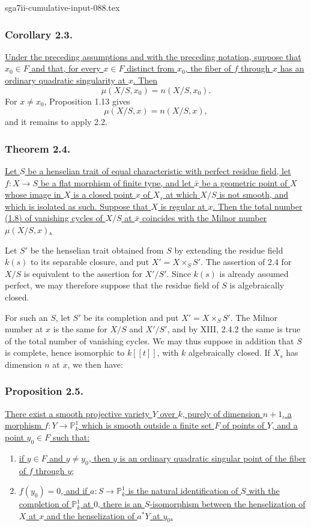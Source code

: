 \begin{filecontents*}{sga7ii-cumulative-input-088.tex}
\subsubsection*{Corollary 2.3.}
\underline{Under the preceding assumptions and with the preceding
notation, suppose that $x_0\in F$ and that, for every
$x\in F$ distinct from $x_0$, the fiber of $f$ through $x$ has an
ordinary quadratic singularity at $x$.  Then}
\[
\mu(X/S,x_0)=n(X/S,x_0).
\]
For $x\ne x_0$, Proposition 1.13 gives
\[
\mu(X/S,x)=n(X/S,x),
\]
and it remains to apply 2.2.

\subsubsection*{Theorem 2.4.}
\underline{Let $S$ be a henselian trait of equal characteristic with
perfect residue field, let $f:X\to S$ be a flat morphism of finite
type, and let $\bar x$ be a geometric point of $X$ whose image in
$X$ is a closed point $x$ of $X_s$ at which $X/S$ is not smooth,
and which is isolated as such.  Suppose that $X$ is regular at $x$.
Then the total number (1.8) of vanishing cycles of $X/S$ at $\bar x$
coincides with the Milnor number $\mu(X/S,x)$.}

Let $S'$ be the henselian trait obtained from $S$ by extending the
residue field $k(s)$ to its separable closure, and put
$X'=X\times_S S'$.  The assertion of 2.4 for $X/S$ is equivalent to
the assertion for $X'/S'$.  Since $k(s)$ is already assumed perfect,
we may therefore suppose that the residue field of $S$ is
algebraically closed.

For such an $S$, let $S'$ be its completion and put
$X'=X\times_S S'$.  The Milnor number at $x$ is the same for $X/S$
and $X'/S'$, and by XIII, 2.4.2 the same is true of the total number
of vanishing cycles.  We may thus suppose in addition that $S$ is
complete, hence isomorphic to $k[[t]]$, with $k$ algebraically
closed.  If $X_s$ has dimension $n$ at $x$, we then have:

\subsubsection*{Proposition 2.5.}
\underline{There exist a smooth projective variety $Y$ over $k$,
purely of dimension $n+1$, a morphism
$f:Y\to\mathbb P^1_k$ which is smooth outside a finite set $F$ of
points of $Y$, and a point $y_0\in F$ such that:}
\begin{enumerate}
\item[(a)] \underline{if $y\in F$ and $y\ne y_0$, then $y$ is an
ordinary quadratic singular point of the fiber of $f$ through $y$;}
\item[(b)] \underline{$f(y_0)=0$, and if
$a:S\to\mathbb P^1_k$ is the natural identification of $S$ with the
completion of $\mathbb P^1_k$ at $0$, there is an $S$-isomorphism
between the henselization of $X$ at $x$ and the henselization of
$a^*Y$ at $y_0$.}
\end{enumerate}


\end{filecontents*}
